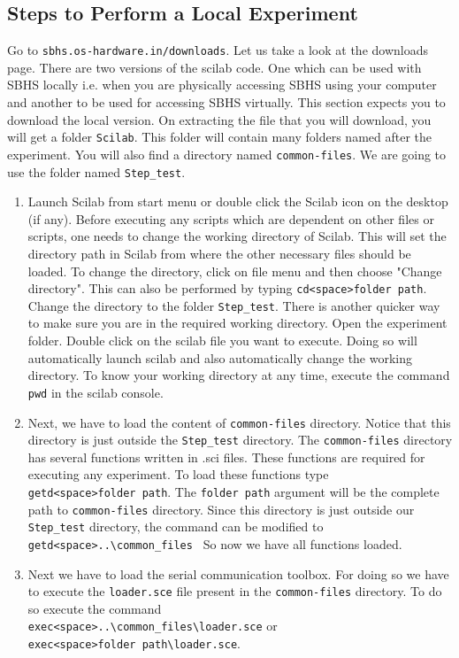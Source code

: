 \subsection{Steps to Perform a Local Experiment}
\label{scilab_sbhs}
Go to {\tt sbhs.os-hardware.in/downloads}. Let us take a look at the downloads page. There are two versions of the scilab code. One which can be used with SBHS locally i.e. when you are physically accessing SBHS using your computer and another to be used for accessing SBHS virtually. This section expects you to download the local version. On extracting the file that you will download, you will get a folder {\tt Scilab}. This folder will contain many folders named after the experiment. You will also find a directory named {\tt common-files}. We are going to use the folder named {\tt Step\_test}.
\begin{enumerate}
\item Launch Scilab from start menu or double click the Scilab icon on the desktop (if any). Before executing any scripts which are dependent on other files or scripts, one needs to change the working directory of Scilab. This will set the directory path in Scilab from where the other necessary files should be loaded.  To change the directory, click on file menu and then choose "Change directory". This can also be performed by typing {\tt cd<space>folder path}. Change the directory to the folder  {\tt Step\_test}. There is another quicker way to make sure you are in the required working directory. Open the experiment folder. Double click on the scilab file you want to execute. Doing so will automatically launch scilab and also automatically change the working directory. To know your working directory at any time, execute the command {\tt pwd} in the scilab console. 
\item Next, we have to load the content of {\tt common-files} directory. Notice that this directory is just outside the {\tt Step\_test} directory. The  {\tt common-files} directory has several functions written in .sci files. These functions are required for executing any experiment. To load these functions type \\{\tt getd<space>folder path}. The {\tt folder path} argument will be the complete path to {\tt common-files} directory. Since this directory is just outside our {\tt Step\_test} directory, the command can be modified to \\{\tt getd<space>..\textbackslash common\_files\ } So now we have all functions loaded. 
\item Next we have to load the serial communication toolbox. For doing so we have to execute the {\tt loader.sce} file present in the {\tt common-files} directory. To do so execute the command \\{\tt exec<space>..\textbackslash common\_files\textbackslash loader.sce} or\\ {\tt exec<space>folder path\textbackslash loader.sce}. 

\end{enumerate}
